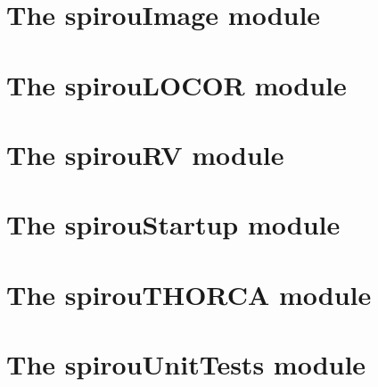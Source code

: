 \section{The spirouImage module}
\label{ch:the_module:spirouImage}


\section{The spirouLOCOR module}
\label{ch:the_module:spirouLOCOR}


\section{The spirouRV module}
\label{ch:the_module:spirouRV}


\section{The spirouStartup module}
\label{ch:the_module:spirouStartup}


\section{The spirouTHORCA module}
\label{ch:the_module:spirouTHORCA}


\section{The spirouUnitTests module}
\label{ch:the_module:spirouUnitTests}

